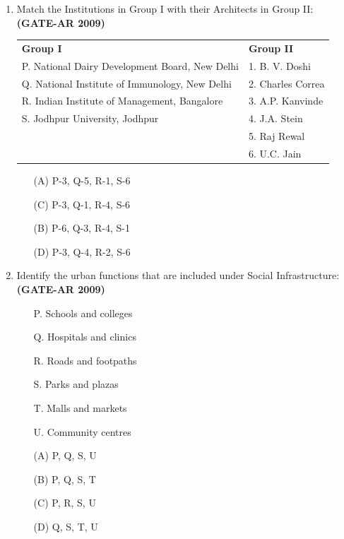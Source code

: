 \documentclass[a4paper,10pt]{article}
\begin{document}
\begin{enumerate}
    \item Match the Institutions in Group I with their Architects in Group II: \hfill \textbf{(GATE-AR 2009)} \\
    \begin{tabular}{ p{\dimexpr\columnwidth-2\tabcolsep} p{\dimexpr\columnwidth-2\tabcolsep} }
	\textbf{Group I} & \textbf{Group II} \\
	P. National Dairy Development Board, New Delhi & 1. B. V. Doshi \\
	Q. National Institute of Immunology, New Delhi & 2. Charles Correa \\
	R. Indian Institute of Management, Bangalore & 3. A.P. Kanvinde \\
	S. Jodhpur University, Jodhpur & 4. J.A. Stein \\
	& 5. Raj Rewal \\
	& 6. U.C. Jain \\
	\end{tabular}
	\begin{multicols}{2}
	\begin{itemize}
        \item[(A)] P-3, Q-5, R-1, S-6
        \item[(C)] P-3, Q-1, R-4, S-6
        \item[(B)] P-6, Q-3, R-4, S-1
        \item[(D)] P-3, Q-4, R-2, S-6
    \end{itemize}
	\end{multicols}

    \item Identify the urban functions that are included under Social Infrastructure: \hfill \textbf{(GATE-AR 2009)}
    \begin{itemize}
        \item[P.] Schools and colleges
        \item[Q.] Hospitals and clinics
        \item[R.] Roads and footpaths
        \item[S.] Parks and plazas
        \item[T.] Malls and markets
        \item[U.] Community centres
    \end{itemize}
    \begin{multicols}{4}
	\begin{itemize}
        \item[(A)] P, Q, S, U
        \item[(B)] P, Q, S, T
        \item[(C)] P, R, S, U
        \item[(D)] Q, S, T, U
    \end{itemize}
	\end{multicols}


\end{enumerate}
\end{document}
